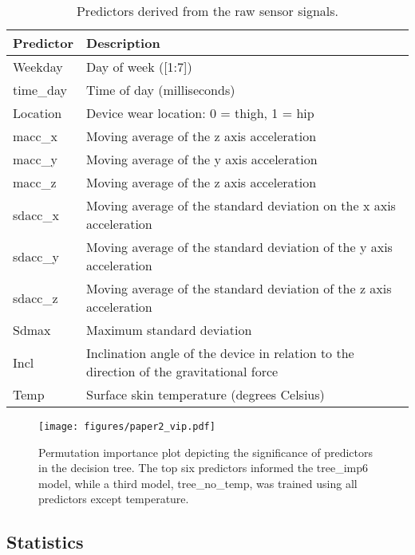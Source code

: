 \documentclass[
  10pt,
]{scrbook}
\begin{document}
\begingroup

\footnotesize

\hypertarget{tbl-8}{}
\begin{longtable}{ll}
\caption{\label{tbl-8}Predictors derived from the raw sensor signals. }\tabularnewline

\toprule
Predictor & Description \\ 
\midrule
Weekday & Day of week ([1:7]) \\ 
time\_day & Time of day (milliseconds) \\ 
Location & Device wear location: 0 = thigh, 1 = hip \\ 
macc\_x & Moving average of the z axis acceleration \\ 
macc\_y & Moving average of the y axis acceleration \\ 
macc\_z & Moving average of the z axis acceleration \\ 
sdacc\_x & Moving average of the standard deviation on the x axis acceleration \\ 
sdacc\_y & Moving average of the standard deviation of the y axis acceleration \\ 
sdacc\_z & Moving average of the standard deviation of the z axis acceleration \\ 
Sdmax & Maximum standard deviation \\ 
Incl & Inclination angle of the device in relation to the direction of the gravitational force \\ 
Temp & Surface skin temperature (degrees Celsius) \\ 
\bottomrule
\end{longtable}

\endgroup

\begin{figure}

{\centering \texttt{[image: figures/paper2\_vip.pdf]}

}

\caption{\label{fig-importance}Permutation importance plot depicting the
significance of predictors in the decision tree. The top six predictors
informed the \textsf{tree\_imp6} model, while a third model,
\textsf{tree\_no\_temp}, was trained using all predictors except
temperature.}

\end{figure}

\hypertarget{statistics-1}{%
\subsection{Statistics}\label{statistics-1}}
\end{document}
